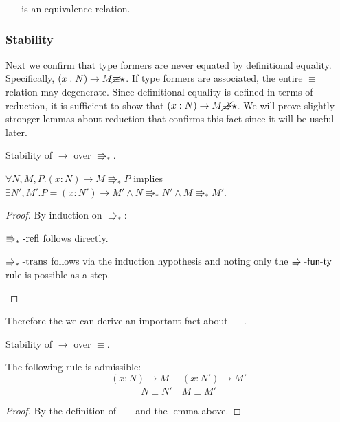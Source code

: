 \begin{fact} $\equiv$ is an equivalence relation.
\end{fact}
 
\subsubsection{Stability}
Next we confirm that type formers are never equated by definitional equality.
Specifically, $\left(x:N\right)\rightarrow M\cancel{\equiv}\star$.
If type formers are associated, the entire $\equiv$ relation may degenerate. %
Since definitional equality is defined in terms of reduction, it is sufficient to show that $\left(x:N\right)\rightarrow M\cancel{\Rrightarrow}\star$.
We will prove slightly stronger lemmas about reduction that confirms this fact since it will be useful later.
 
\begin{lem} Stability of $\rightarrow$ over $\Rrightarrow_{\ast}$.
 
$\forall N,M,P.\left(x:N\right)\rightarrow M\Rrightarrow_{\ast}P$ implies $\exists N',M'.P=\left(x:N'\right)\rightarrow M'\land N\Rrightarrow_{\ast}N'\land M\Rrightarrow_{\ast}M'$.
\end{lem}
\begin{proof}
By induction on $\Rrightarrow_{\ast}$:
\begin{casenv}
 \item $\operatorname{\Rrightarrow_{\ast}-refl}$ follows directly.
 \item $\operatorname{\Rrightarrow_{\ast}-trans}$ follows via the induction hypothesis and noting only the $\operatorname{\Rrightarrow-\mathsf{fun}-ty}$ rule is possible as a step.
\end{casenv}
\end{proof}

Therefore the we can derive an important fact about $\equiv$.

\begin{cor} Stability of $\rightarrow$ over $\equiv$.

The following rule is admissible:
\[
\frac{\left(x:N\right)\rightarrow M\equiv\left(x:N'\right)\rightarrow M'}{N\equiv N'\quad M\equiv M'}
\]
\end{cor}
\begin{proof}
By the definition of $\equiv$ and the lemma above.
\end{proof}
 
